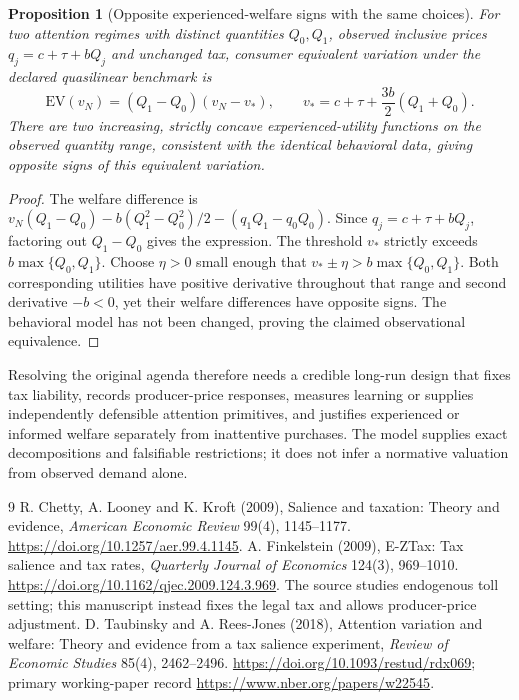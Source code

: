 \documentclass[11pt]{article}
\newtheorem{proposition}[theorem]{Proposition}
\theoremstyle{remark}\newtheorem{remark}[theorem]{Remark}
\begin{document}
\begin{proposition}[Opposite experienced-welfare signs with the same choices]
For two attention regimes with distinct quantities $Q_0,Q_1$, observed inclusive prices $q_j=c+\tau+bQ_j$ and unchanged tax, consumer equivalent variation under the declared quasilinear benchmark is
\[
 \mathrm{EV}(v_N)=(Q_1-Q_0)(v_N-v_*),\qquad
 v_*=c+\tau+\frac{3b}{2}(Q_1+Q_0).
\]
There are two increasing, strictly concave experienced-utility functions on the observed quantity range, consistent with the identical behavioral data, giving opposite signs of this equivalent variation.
\end{proposition}
\begin{proof}
The welfare difference is $v_N(Q_1-Q_0)-b(Q_1^2-Q_0^2)/2-(q_1Q_1-q_0Q_0)$. Since $q_j=c+\tau+bQ_j$, factoring out $Q_1-Q_0$ gives the expression. The threshold $v_*$ strictly exceeds $b\max\{Q_0,Q_1\}$. Choose $\eta>0$ small enough that $v_*\pm\eta>b\max\{Q_0,Q_1\}$. Both corresponding utilities have positive derivative throughout that range and second derivative $-b<0$, yet their welfare differences have opposite signs. The behavioral model has not been changed, proving the claimed observational equivalence.
\end{proof}

Resolving the original agenda therefore needs a credible long-run design that fixes tax liability, records producer-price responses, measures learning or supplies independently defensible attention primitives, and justifies experienced or informed welfare separately from inattentive purchases. The model supplies exact decompositions and falsifiable restrictions; it does not infer a normative valuation from observed demand alone.

\begin{thebibliography}{9}
 R. Chetty, A. Looney and K. Kroft (2009), Salience and taxation: Theory and evidence, \emph{American Economic Review} 99(4), 1145--1177. \url{https://doi.org/10.1257/aer.99.4.1145}.
 A. Finkelstein (2009), E-ZTax: Tax salience and tax rates, \emph{Quarterly Journal of Economics} 124(3), 969--1010. \url{https://doi.org/10.1162/qjec.2009.124.3.969}. The source studies endogenous toll setting; this manuscript instead fixes the legal tax and allows producer-price adjustment.
 D. Taubinsky and A. Rees-Jones (2018), Attention variation and welfare: Theory and evidence from a tax salience experiment, \emph{Review of Economic Studies} 85(4), 2462--2496. \url{https://doi.org/10.1093/restud/rdx069}; primary working-paper record \url{https://www.nber.org/papers/w22545}.
\end{thebibliography}
\end{document}
